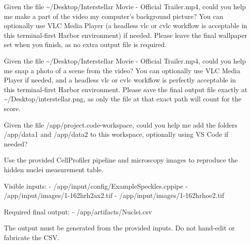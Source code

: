 \documentclass{llmxive}
\begin{document}
\begin{instructionbox}
Given the file \textasciigrave{}\textasciitilde{}/Desktop/Interstellar Movie - Official Trailer.mp4\textasciigrave{}, could you help me make a part of the video my computer's background picture? You can optionally use VLC Media Player (a headless \textasciigrave{}vlc\textasciigrave{} or \textasciigrave{}cvlc\textasciigrave{} workflow is acceptable in this terminal-first Harbor environment) if needed. Please leave the final wallpaper set when you finish, as no extra output file is required.
\end{instructionbox}

\begin{instructionbox}
Given the file \textasciigrave{}\textasciitilde{}/Desktop/Interstellar Movie - Official Trailer.mp4\textasciigrave{}, could you help me snap a photo of a scene from the video? You can optionally use VLC Media Player if needed, and a headless \textasciigrave{}vlc\textasciigrave{} or \textasciigrave{}cvlc\textasciigrave{} workflow is perfectly acceptable in this terminal-first Harbor environment. Please save the final output file exactly at \textasciigrave{}\textasciitilde{}/Desktop/interstellar.png\textasciigrave{}, as only the file at that exact path will count for the score.
\end{instructionbox}

\begin{instructionbox}
Given the file \textasciigrave{}/app/project.code-workspace\textasciigrave{}, could you help me add the folders \textasciigrave{}/app/data1\textasciigrave{} and \textasciigrave{}/app/data2\textasciigrave{} to this workspace, optionally using VS Code if needed?
\end{instructionbox}

\begin{instructionbox}
Use the provided CellProfiler pipeline and microscopy images to reproduce the hidden nuclei measurement table.

Visible inputs:
- \textasciigrave{}/app/input/config/ExampleSpeckles.cppipe\textasciigrave{}
- \textasciigrave{}/app/input/images/1-162hrh2ax2.tif\textasciigrave{}
- \textasciigrave{}/app/input/images/1-162hrhoe2.tif\textasciigrave{}

Required final output:
- \textasciigrave{}/app/artifacts/Nuclei.csv\textasciigrave{}

The output must be generated from the provided inputs. Do not hand-edit or fabricate the CSV.
\end{instructionbox}
\end{document}
